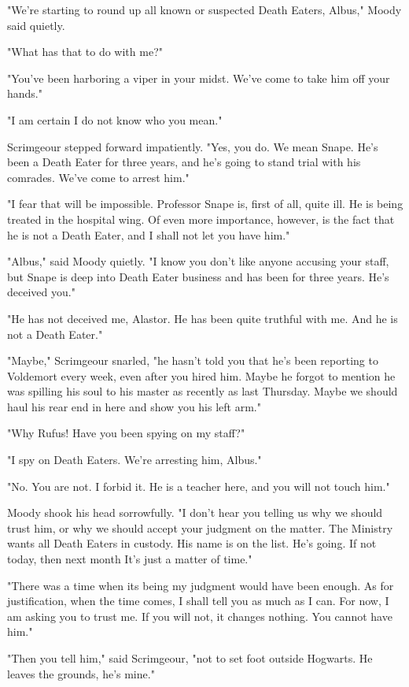 "We're starting to round up all known or suspected Death Eaters, Albus," Moody said quietly.

"What has that to do with me?"

"You've been harboring a viper in your midst. We've come to take him off your hands."

"I am certain I do not know who you mean."

Scrimgeour stepped forward impatiently. "Yes, you do. We mean Snape. He's been a Death Eater for three years, and he's going to stand trial with his comrades. We've come to arrest him."

"I fear that will be impossible. Professor Snape is, first of all, quite ill. He is being treated in the hospital wing. Of even more importance, however, is the fact that he is not a Death Eater, and I shall not let you have him."

"Albus," said Moody quietly. "I know you don't like anyone accusing your staff, but Snape is deep into Death Eater business and has been for three years. He's deceived you."

"He has not deceived me, Alastor. He has been quite truthful with me. And he is not a Death Eater."

"Maybe," Scrimgeour snarled, "he hasn't told you that he's been reporting to Voldemort every week, even after you hired him. Maybe he forgot to mention he was spilling his soul to his master as recently as last Thursday. Maybe we should haul his rear end in here and show you his left arm."

"Why Rufus! Have you been spying on my staff?"

"I spy on Death Eaters. We're arresting him, Albus."

"No. You are not. I forbid it. He is a teacher here, and you will not touch him."

Moody shook his head sorrowfully. "I don't hear you telling us why we should trust him, or why we should accept your judgment on the matter. The Ministry wants all Death Eaters in custody. His name is on the list. He's going. If not today, then next month{\el} It's just a matter of time."

"There was a time when its being my judgment would have been enough. As for justification, when the time comes, I shall tell you as much as I can. For now, I am asking you to trust me. If you will not, it changes nothing. You cannot have him."

"Then you tell him," said Scrimgeour, "not to set foot outside Hogwarts. He leaves the grounds, he's mine."

